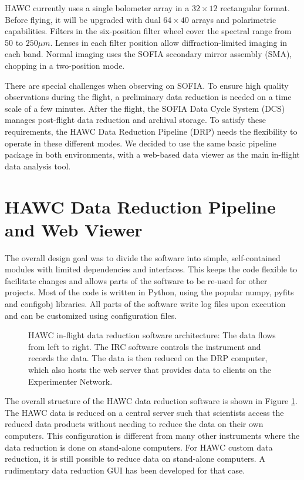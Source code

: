 HAWC currently uses a single bolometer array in a $32\times12$ rectangular format. Before flying, it will be upgraded with dual $64\times40$ arrays and polarimetric capabilities. Filters in the six-position filter wheel cover the spectral range from 50 to $250\mu m$. Lenses in each filter position allow diffraction-limited imaging in each band. Normal imaging uses the SOFIA secondary mirror assembly (SMA), chopping in a two-position mode.

There are special challenges when observing on SOFIA. To ensure high quality observations during the flight, a preliminary data reduction is needed on a time scale of a few minutes. After the flight, the SOFIA Data Cycle System (DCS) \citep[see][]{P050_adassxxii} manages post-flight data reduction and archival storage. To satisfy these requirements, the HAWC Data Reduction Pipeline (DRP) needs the flexibility to operate in these different modes. We decided to use the same basic pipeline package in both environments, with a web-based data viewer as the main in-flight data analysis tool.

\section{HAWC Data Reduction Pipeline and Web Viewer}

The overall design goal was to divide the software into simple, self-contained modules with limited dependencies and interfaces. This keeps the code flexible to facilitate changes and allows parts of the software to be re-used for other projects. Most of the code is written in Python, using the popular numpy, pyfits and configobj libraries. All parts of the software write log files upon execution and can be customized using configuration files.

\begin{figure}

\caption{HAWC in-flight data reduction software architecture: The data flows from left to right. The IRC software controls the instrument and records the data. The data is then reduced on the DRP computer, which also hosts the web server that provides data to clients on the Experimenter Network.}

\label{fig_struct}

\end{figure}

The overall structure of the HAWC data reduction software is shown in Figure \ref{fig_struct}. The HAWC data is reduced on a central server such that scientists access the reduced data products without needing to reduce the data on their own computers. This configuration is different from many other instruments where the data reduction is done on stand-alone computers. For HAWC custom data reduction, it is still possible to reduce data on stand-alone computers. A rudimentary data reduction GUI has been developed for that case.

